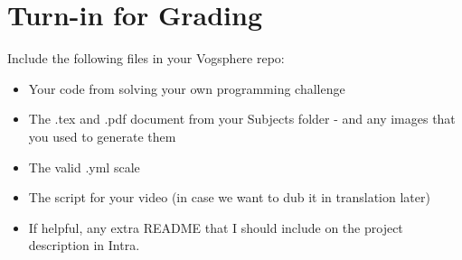 \documentclass{42-en}
\begin{document}
\chapter{Turn-in for Grading}

Include the following files in your Vogsphere repo:

\begin{itemize}
	\item Your code from solving your own programming challenge
	\item The .tex and .pdf document from your Subjects folder - and any images that you used to generate them
	\item The valid .yml scale
	\item The script for your video (in case we want to dub it in translation later)
	\item If helpful, any extra README that I should include on the project description in Intra.
\end{itemize}
\end{document}
